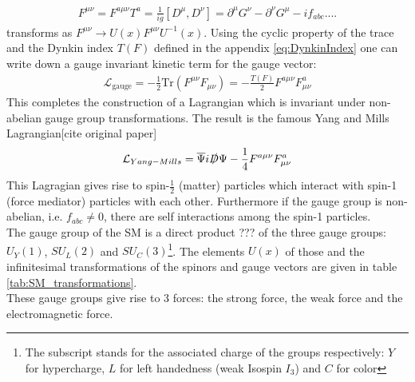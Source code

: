 \begin{align}
F^{\mu\nu} = F^{a\mu\nu}T^a = \frac{1}{ig}[D^\mu,D^\nu] = \partial^\mu G^\nu - \partial^\nu G^\mu - i f_{abc}....
\end{align}
transforms as $F^{\mu\nu} \to U(x)F^{\mu\nu}U^{-1}(x)$. Using the cyclic property of the trace and the Dynkin index $T(F)$ defined in the appendix \ref{eq:DynkinIndex}  one can write down a gauge invariant kinetic term for the gauge vector:
\begin{align}
\mathcal{L}_{\mathrm{gauge}} = - \frac{1}{2} \mathrm{Tr} \left( F^{\mu\nu}F_{\mu\nu} \right) = -\frac{T(F)}{2} F^{a\mu\nu}F^a_{\mu\nu}
\end{align}
This completes the construction of a Lagrangian which is invariant under non-abelian gauge group transformations. The result is the famous Yang and Mills Lagrangian[cite original paper]
\begin{align}
\mathcal{L}_{Yang-Mills} = \overline{\Psi}i\slashed{D}\Psi - \frac{1}{4}F^{a\mu\nu}F^a_{\mu\nu}
\end{align}
This Lagragian gives rise to spin-$\frac{1}{2}$ (matter) particles which interact with spin-1 (force mediator) particles with each other. Furthermore if the gauge group is non-abelian, i.e. $f_{abc} \neq 0$, there are self interactions among the spin-1 particles.\\
The gauge group of the SM is a direct product ??? of the three gauge groups: $U_Y(1)$, $SU_L(2)$ and $SU_C(3)$\footnote{The subscript stands for the associated charge of the groups respectively: $Y$ for hypercharge, $L$ for left handedness (weak Isospin $I_3$) and $C$ for color}. The elements $U(x)$ of those and the infinitesimal transformations of the spinors and gauge vectors are given in table \ref{tab:SM_transformations}.\\
These gauge groups give rise to 3 forces: the strong force, the weak force and the electromagnetic force.
